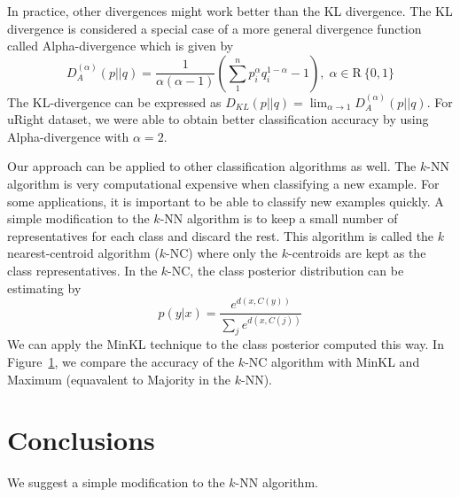 \documentclass{article}
\begin{document}
In practice, other divergences might work better than the KL
divergence. The KL divergence is considered a special case of a
more general divergence function called Alpha-divergence which is
given by
\[
D^{(\alpha)}_A (p||q) = \frac{1}{\alpha(\alpha - 1)}\left( \sum_1^n
  p^{\alpha}_i q^{1-\alpha}_i - 1\right), \; \alpha \in \mathrm{R} \ \{0,1\}
\]
The KL-divergence can be expressed as $D_{KL} (p || q) = \lim_{\alpha
\rightarrow 1} D^{(\alpha)}_A (p || q)$. 
For uRight dataset, we were able to obtain better classification
accuracy by using Alpha-divergence with $\alpha = 2$.

Our approach can be applied to other classification algorithms as
well. The $k$-NN algorithm is very computational expensive when
classifying a new example. For some applications, it is
important to be able to classify new examples quickly. A simple
modification to the $k$-NN algorithm is to keep a small number of
representatives for each class and discard the rest. This algorithm is
called the $k$ nearest-centroid algorithm ($k$-NC) where only the
$k$-centroids are kept as the class representatives. In the $k$-NC,
the class posterior distribution can be estimating by
\[
p(y|x) = \frac{e^{d(x,C(y))}}{\sum_j e^{d(x, C(j))} }
\]
We can apply the MinKL technique to the class posterior computed this
way. In Figure~\ref{}, we compare the accuracy of the $k$-NC algorithm
with MinKL and Maximum (equavalent to Majority in the $k$-NN).

\section{Conclusions}

We suggest a simple modification to the $k$-NN algorithm.



\end{document}
